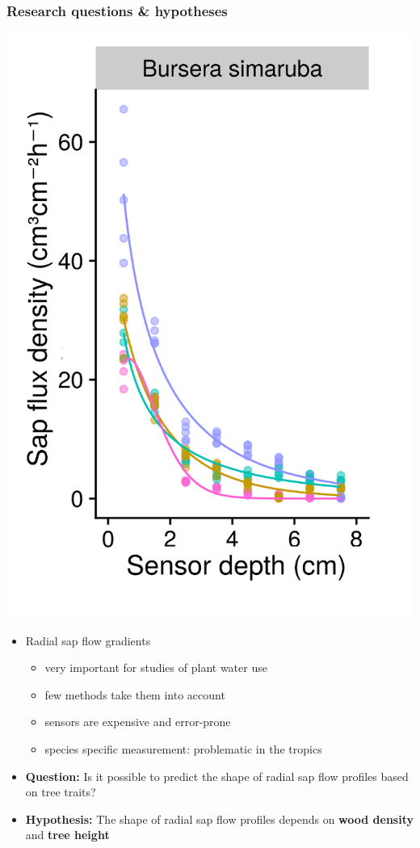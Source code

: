 \documentclass[usepdftitle=false]{beamer}
\newcommand{\Blue}[1]{{\color{blue!50!black}\textbf{#1}}}
\newcommand{\Rar}{$\Rightarrow$}
\newcommand{\tw}{\textwidth}
\begin{document}
\begin{frame}
	\frametitle{Research questions \& hypotheses}
	\begin{minipage}{0.38\tw}
		\includegraphics[width = \tw]{figures/HFD_05_profile_simarouba.png}
	\end{minipage}
	\begin{minipage}{0.6\tw}
			\begin{itemize}
			\item Radial sap flow gradients
			\begin{itemize}[<+-| alert@+>]
				\item very important for studies of plant water use
				\item few methods take them into account
				\item sensors are expensive and error-prone
			  \item species specific measurement: problematic in the tropics		
			\end{itemize}
			\item<+-| alert@+>[\Rar] \Blue{Question:} Is it possible to predict the shape of radial sap flow profiles based on tree traits?
			\item<visible@+| alert@+>[\Rar] \Blue{Hypothesis:} The shape of radial sap flow profiles depends on \textbf{wood density} and \textbf{tree height}
		\end{itemize}						
	\end{minipage}
\end{frame}
\end{document}
